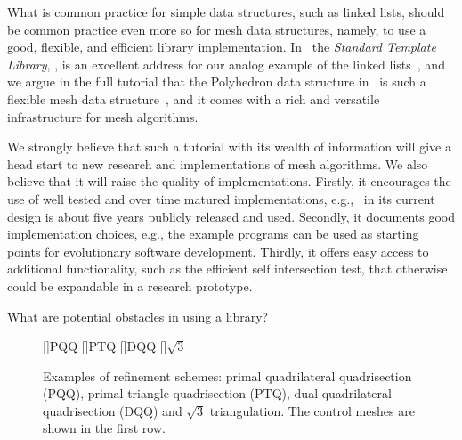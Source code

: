 \documentclass[twocolumn]{article}
\begin{document}
What is common practice for simple data structures, such as linked
lists, should be common practice even more so for mesh data
structures, namely, to use a good, flexible, and efficient library
implementation. In \CC\, the \emph{Standard Template Library}, \stl,
is an excellent address for our analog example of the linked
lists~\cite{Austern:1999:GPS}, and we argue in the full tutorial that
the Polyhedron data structure in \cgal\ is such a flexible mesh data
structure~\cite{k-ugpdd-99}, and it comes with a rich and versatile
infrastructure for mesh algorithms.

We strongly believe that such a tutorial with its wealth of
information will give a head start to new research and implementations
of mesh algorithms. We also believe that it will raise the quality of
implementations. Firstly, it encourages the use of well tested and
over time matured implementations, e.g., \cgalpoly\ in its current
design is about five years publicly released and used. Secondly, it
documents good implementation choices, e.g., the example programs can
be used as starting points for evolutionary software development.
Thirdly, it offers easy access to additional functionality, such as
the efficient self intersection test, that otherwise could be
expandable in a research prototype.

\noindent
What are potential obstacles in using a library?

\begin{figure}[tb]
  \centering
  []{\scriptsize PQQ} 
  []{\scriptsize PTQ}
  []{\scriptsize DQQ} 
  []{\scriptsize $\sqrt{3}$} 
  \caption{Examples of refinement schemes: 
    primal quadrilateral quadrisection (PQQ),
    primal triangle quadrisection (PTQ),
    dual quadrilateral quadrisection (DQQ) and
    $\sqrt{3}$ triangulation. The control meshes are shown
    in the first row.}
  \label{fig:RefSchemes}
\end{figure}
\end{document}
